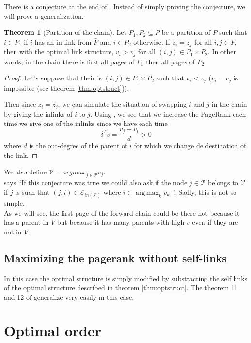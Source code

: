 \documentclass{article}
\DeclareMathOperator*{\argmax}{arg\,max}
\newcommand{\1}{\mathbf{1}}
\theoremstyle{definition}
\newtheorem{mytheo}[mydef]{Theorem}
\begin{document}
There is a conjecture at the end of \cite{de2008maximizing}.
Instead of simply proving the conjecture, we will prove a generalization.
\begin{mytheo}[Partition of the chain]
  \label{theo:partition}
  Let $P_1,P_2 \subseteq P$ be a partition of $P$ such that
  $i \in P_1$ if $i$ has an in-link from $\bar{P}$ and $i \in P_2$
  otherwise.
  If $z_i = z_j$ for all $i,j \in P$,
  then with the optimal link structure,
  $v_i > v_j$ for all $(i,j) \in P_1 \times P_2$.
  In other words, in the chain there is first all pages of
  $P_1$ then all pages of $P_2$.
  \begin{proof}
    Let's suppose that their is $(i,j) \in P_1 \times P_2$
    such that $v_i < v_j$ ($v_i = v_j$ is impossible (see theorem \ref{thm:optstruct})).

    Then since $z_i = z_j$, we can simulate the situation of swapping $i$ and $j$ in the chain
    by giving the inlinks of $i$ to $j$.
    Using \cite[theorem~5]{de2008maximizing}, we see that we increase the PageRank each time we give one of the inlinks since
    we have each time
    \[ \delta^Tv = \frac{v_j - v_i}{d} > 0 \]
    where $d$ is the out-degree of the parent of $i$ for which we change de destination of the link.
  \end{proof}
\end{mytheo}
We also define $\mathcal{V} = argmax_{j\in \overline{\mathcal{P}}}v_j$. \\
\cite{de2008maximizing} says
``If this conjecture was true we could also ask if the node $j \in \mathcal{P}$ belongs to $\mathcal{V}$ if $j$ is such that
$(j, i) \in \mathcal{E}_{in(\mathcal{P})}$ where $i \in \argmax_k v_k$ ''.
Sadly, this is not so simple. \\
As we will see, the first page of the forward chain could be there not
because it has a parent in $V$ but because it has many parents with high $v$ even if they are not in $V$.

\subsection{Maximizing the pagerank without self-links}
In this case the optimal structure is simply modified by substracting the self links of the optimal structure described in theorem \ref{thm:optstruct}. The theorem 11 and 12 of \cite{de2008maximizing} generalize very easily in this case.


\section{Optimal order}
\end{document}

